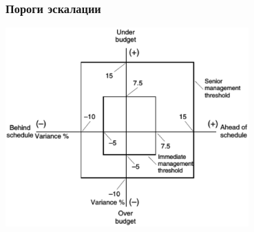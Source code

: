 \documentclass{../../slides-style}
\begin{document}
    \begin{frame}
        \frametitle{Пороги эскалации}
        \begin{center}
            \includegraphics[width=0.7\textwidth]{escalationThresholds.png}
        \end{center}
    \end{frame}
\end{document}
